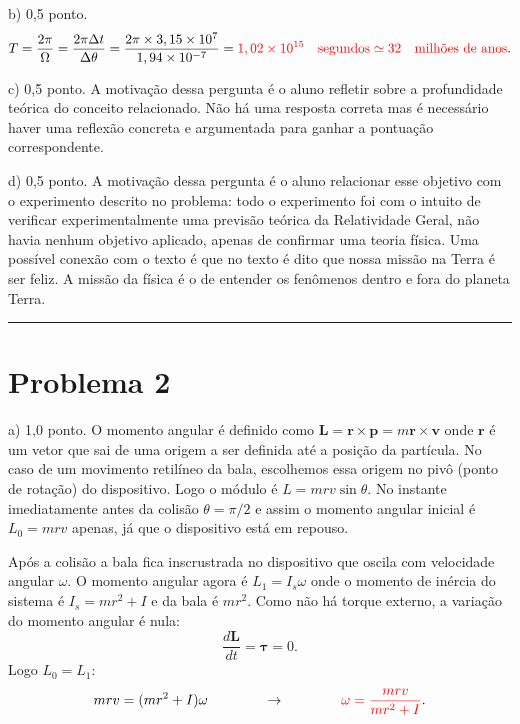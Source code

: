 \documentclass[a4paper, 11pt]{article}
\begin{document}
{\color{red}b) 0,5 ponto.}
\begin{equation}
T = \dfrac{2\pi}{\Omega} = \dfrac{2 \pi \Delta t}{\Delta \theta} = \dfrac{2 \pi \times 3,15 \times 10^7 }{1,94 \times 10^{-7}} = {\color{red}1,02 \times 10^{15} \quad \text{segundos} \simeq 32 \quad \text{milhões de anos}}. \nonumber
\end{equation}

{\color{red}c) 0,5 ponto.} A motivação dessa pergunta é o aluno refletir sobre a profundidade teórica do conceito relacionado. Não há uma resposta correta mas é necessário haver uma reflexão concreta e argumentada para ganhar a pontuação correspondente.

{\color{red}d) 0,5 ponto.} A motivação dessa pergunta é o aluno relacionar esse objetivo com o experimento descrito no problema: todo o experimento foi com o intuito de verificar experimentalmente uma previsão teórica da Relatividade Geral, não havia nenhum objetivo aplicado, apenas de confirmar uma teoria física. Uma possível conexão com o texto é que no texto é dito que nossa missão na Terra é ser feliz. A missão da física é o de entender os fenômenos dentro e fora do planeta Terra.

 
 {\noindent\def\stackalignment{l}{\textcolor{lightcyan}{\rule{\linewidth}{2pt}}}\medskip}
 
\section*{Problema 2} 
 
{\color{red}a) 1,0 ponto.} O momento angular é definido como $\textbf{L} = \textbf{r} \times \textbf{p} = m \textbf{r} \times \textbf{v}$ onde $\textbf{r}$ é um vetor que sai de uma origem a ser definida até a posição da partícula. No caso de um movimento retilíneo da bala, escolhemos essa origem no pivô (ponto de rotação) do dispositivo. Logo o módulo é $L = mrv \sin \theta$. No instante imediatamente antes da colisão $\theta = \pi/2$ e assim o momento angular inicial é $L_0 = mrv$ apenas, já que o dispositivo está em repouso. 

Após a colisão a bala fica inscrustrada no dispositivo que oscila com velocidade angular $\omega$. O momento angular agora é $L_1 = I_s \omega$ onde o momento de inércia do sistema é $I_s= mr^2 + I$ e da bala é $mr^2$. Como não há torque externo, a variação do momento angular é nula:
\begin{equation}
\dfrac{d\textbf{L}}{dt} = \bm{\tau} = 0. \nonumber 
\end{equation}  
Logo $L_0= L_1$:
\begin{equation}
mrv = (mr^2 +I) \omega \qquad \qquad \rightarrow \qquad \qquad {\color{red}\omega = \dfrac{mrv}{mr^2 + I}}. \nonumber
\end{equation}
\end{document}
